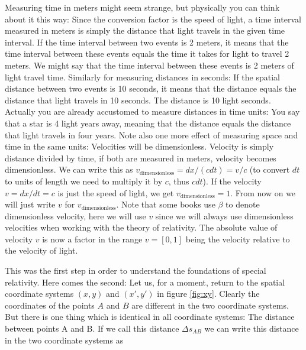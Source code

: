 {\begin{multicols}{2}
Measuring time in meters might seem strange, but physically you can think about it this way: Since the conversion factor is the speed of light, a time interval measured in meters is simply the distance that light travels in the given time interval. If the time interval between two events is 2 meters, it means that the time interval between these events equals the time it takes for light to travel 2 meters. We might say that the time interval between these events is 2 meters of light travel time. Similarly for measuring distances in seconds: If the spatial distance between two events is 10 seconds, it means that the distance equals the distance that light travels in 10 seconds. The distance is 10 light seconds. Actually you are already accustomed to measure distances in time units: You say that a star is 4 light years away, meaning that the distance equals the distance that light travels in four years. Note also one more effect of measuring space and time in the same units: Velocities will be dimensionless. Velocity is simply distance divided by time, if both are measured in meters, velocity becomes dimensionless. We can write this as $v_\mathrm{dimensionless}=dx/(cdt)=v/c$ (to convert $dt$ to units of length we need to multiply it by $c$, thus $cdt$). If the velocity $v=dx/dt=c$ is just the speed of light, we get $v_\mathrm{dimensionless}=1$. From now on we will just write $v$  for $v_\mathrm{dimensionless}$. Note that some books use $\beta$ to denote dimensionless velocity, here we will use $v$ since we will always use dimensionless velocities when working with the theory of relativity. The absolute value of velocity $v$ is now a factor in the range $v=[0,1]$ being the velocity relative to the velocity of light. 

This was the first step in order to understand the foundations of special relativity. Here comes the second: Let us, for a moment, return to the spatial coordinate systems $(x,y)$ and $(x',y')$ in figure \ref{fig:xy}. Clearly the coordinates of the points $A$ and $B$ are different in the two coordinate systems. But there is one thing which is identical in all coordinate systems: The distance between points A and B. If we call this distance $\Delta s_{AB}$ we can write this distance in the two coordinate systems as



\end{multicols}}

